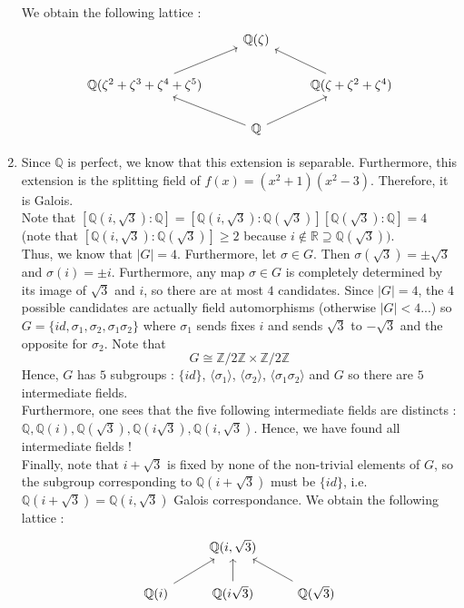 \documentclass[12pt,a4paper]{article}
\begin{document}
\begin{enumerate}[label = \alph*)]
	We obtain the following lattice : \[  
	\begin{tikzcd}
	&\mathbb{Q}(\zeta)& \\
	\mathbb{Q}(\zeta^2 + \zeta^3 + \zeta^4 + \zeta^5) \arrow[ur] & &\mathbb{Q}(\zeta + \zeta^2 + \zeta^4) \arrow[ul] \\
	&\mathbb{Q} \arrow[ul] \arrow[ur]&
	\end{tikzcd} \]
	
	\item Since $\mathbb{Q}$ is perfect, we know that this extension is separable. Furthermore, this extension is the splitting field of $f(x) = (x^2 + 1)(x^2 - 3)$. Therefore, it is Galois. \\
	Note that $[\mathbb{Q}(i, \sqrt{3}) : \mathbb{Q}] = [\mathbb{Q}(i, \sqrt{3}) : \mathbb{Q}(\sqrt{3})] [\mathbb{Q}(\sqrt{3}) : \mathbb{Q}] = 4$ (note that $[\mathbb{Q}(i, \sqrt{3}) : \mathbb{Q}(\sqrt{3})] \geq 2$ because $i \notin \mathbb{R} \supseteq \mathbb{Q}(\sqrt{3}))$. \\
	Thus, we know that $|G| = 4$. Furthermore, let $\sigma \in G$. Then $\sigma(\sqrt{3}) = \pm \sqrt{3}$ and $\sigma(i) = \pm i$. Furthermore, any map $\sigma \in G$ is completely determined by its image of $\sqrt{3}$ and $i$, so there are at most $4$ candidates. Since $|G| = 4$, the $4$ possible candidates are actually field automorphisms (otherwise $|G| < 4$...) so $G = \{id, \sigma_1, \sigma_2, \sigma_1\sigma_2\}$ where $\sigma_1$ sends fixes $i$ and sends $\sqrt{3}$ to $-\sqrt{3}$ and the opposite for $\sigma_2$. Note that \[G \cong \mathbb{Z}/2\mathbb{Z} \times \mathbb{Z}/2\mathbb{Z} \] Hence, $G$ has $5$ subgroups : $\{id\}$, $\langle \sigma_1 \rangle$, $\langle \sigma_2 \rangle$, $\langle \sigma_1\sigma_2 \rangle$ and $G$ so there are $5$ intermediate fields. \\ Furthermore, one sees that the five following intermediate fields are distincts : $\mathbb{Q}, \mathbb{Q}(i), \mathbb{Q}(\sqrt{3}), \mathbb{Q}(i\sqrt{3}), \mathbb{Q}(i, \sqrt{3})$. Hence, we have found all intermediate fields ! \\
	Finally, note that $i +\sqrt{3}$ is fixed by none of the non-trivial elements of $G$, so the subgroup corresponding to $\mathbb{Q}(i + \sqrt{3})$ must be $\{id\}$, i.e. $\mathbb{Q}(i + \sqrt{3}) = \mathbb{Q}(i, \sqrt{3})$ Galois correspondance. We obtain the following lattice : \[  
	\begin{tikzcd}
	&\mathbb{Q}(i, \sqrt{3})& \\
	\mathbb{Q}(i) \arrow[ur] & \mathbb{Q}(i\sqrt{3}) \arrow[u] &\mathbb{Q}(\sqrt{3}) \arrow[ul] \\

\end{tikzcd}\]
\end{enumerate}
\end{document}
